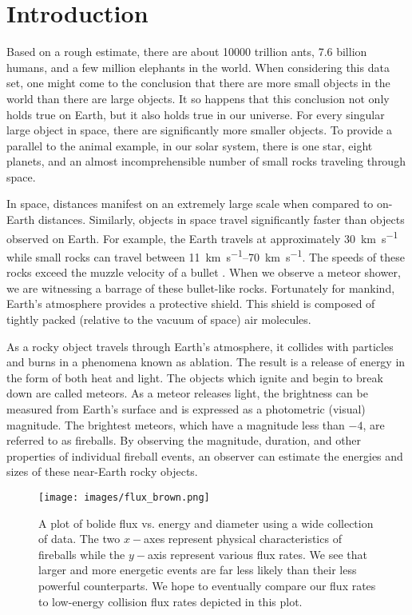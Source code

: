 \chapter{Introduction}

Based on a rough estimate, there are about \num{10000} trillion ants, \num{7.6} billion humans, and a few million elephants in the world.
When considering this data set, one might come to the conclusion that there are more small objects in the world than there are large objects.
It so happens that this conclusion not only holds true on Earth, but it also holds true in our universe.
For every singular large object in space, there are significantly more smaller objects.
To provide a parallel to the animal example, in our solar system, there is one star, eight planets, and an almost incomprehensible number of small rocks traveling through space. 

In space, distances manifest on an extremely large scale when compared to on-Earth distances.  
Similarly, objects in space travel significantly faster than objects observed on Earth.
For example, the Earth travels at approximately \SI{30}{\kilo\meter\per\second} while small rocks can travel between \SIrange{11}{70}{\kilo\meter\per\second}.  
The speeds of these rocks exceed the muzzle velocity of a bullet \cite{russell_photometry_2018}.
When we observe a meteor shower, we are witnessing a barrage of these bullet-like rocks.  
Fortunately for mankind, Earth’s atmosphere provides a protective shield.
This shield is composed of tightly packed (relative to the vacuum of space) air molecules.

As a rocky object travels through Earth’s atmosphere, it collides with particles and burns in a phenomena known as ablation.  
The result is a release of energy in the form of both heat and light.  
The objects which ignite and begin to break down are called meteors.
As a meteor releases light, the brightness can be measured from Earth's surface and is expressed as a photometric (visual) magnitude. 
The brightest meteors, which have a magnitude less than $-4$, are referred to as fireballs.
By observing the magnitude, duration, and other properties of individual fireball events, an observer can estimate the energies and sizes of these near-Earth rocky objects.

\begin{figure}[ht!]
  \centering
  \texttt{[image: images/flux\_brown.png]}
  \caption[A plot of bolide flux vs. energy and diameter using a wide collection of data.]{A plot of bolide flux vs. energy and diameter using a wide collection of data.  The two $x-$axes represent physical characteristics of fireballs while the $y-$axis represent various flux rates.  We see that larger and more energetic events are far less likely than their less powerful counterparts.  We hope to eventually compare our flux rates to low-energy collision flux rates depicted in this plot.}
  \label{brown}
\end{figure}

